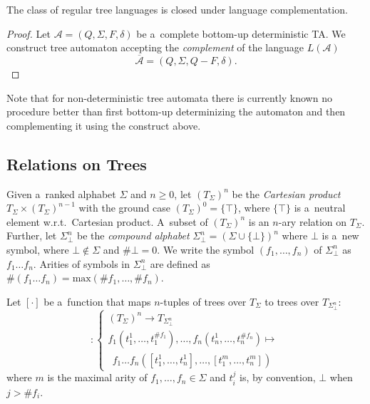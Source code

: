 \begin{theorem}
 The class of regular tree languages is closed under language complementation.
\end{theorem}

\begin{proof}
Let $\mathcal{A} = (Q, \Sigma, F, \delta)$ be a~complete bottom-up deterministic
TA. We construct tree automaton accepting the \emph{complement} of the language
$L(\mathcal{A})$ 
\begin{equation}
\overline{\mathcal{A}} = (Q, \Sigma, Q - F, \delta).
\end{equation}
\end{proof}

Note that for non-deterministic tree automata there is currently known no
procedure better than first bottom-up determinizing the automaton and then
complementing it using the construct above.

 \subsection{Relations on Trees}

Given a~ranked alphabet $\Sigma$ and $n \geq 0$, let $(T_\Sigma)^n$ be the
\emph{Cartesian product} $T_\Sigma \times (T_\Sigma)^{n-1}$ with the ground case
$(T_\Sigma)^0 = \{\top\}$, where $\{\top\}$ is a~neutral element w.r.t.\ 
Cartesian product. A~subset of $(T_\Sigma)^n$ is an $n$-ary relation on
$T_\Sigma$. Further, let $\Sigma^n_\bot$ be the \emph{compound alphabet}
$\Sigma_\bot^n = (\Sigma \cup \{\bot\})^n$ where $\bot$ is a~new symbol, where
$\bot \notin \Sigma$ and $\#\bot = 0$. We write the symbol
$(f_1,\ldots,f_n)$ of $\Sigma_\bot^n$ as $f_1\ldots f_n$. Arities of symbols in
$\Sigma_\bot^n$ are defined as $\#(f_1\ldots f_n) =
\text{max}(\#f_1,\ldots,\#f_n)$.

Let $[\cdot]$ be a~function that maps $n$-tuples of trees over $T_\Sigma$ to
trees over $T_{\Sigma_\bot^n}$:
\begin{equation}
    [\cdot] :
    \begin{cases}
     (T_\Sigma)^n \rightarrow T_{\Sigma^n_\bot}\\
		 f_1(t_1^1,\ldots,t^{\#f_1}_1),\ldots,f_n(t_n^1,\ldots,t^{\#f_n}_n) \mapsto\\
		 \ \ f_1\ldots f_n([t_1^1,\ldots,t_n^1],\ldots,[t_1^m,\ldots,t_n^m])
   \end{cases}
\end{equation}
 where $m$ is the maximal arity of $f_1,\ldots,f_n \in \Sigma$ and $t_i^j$ is,
 by convention, $\bot$ when $j > \#f_i$.

